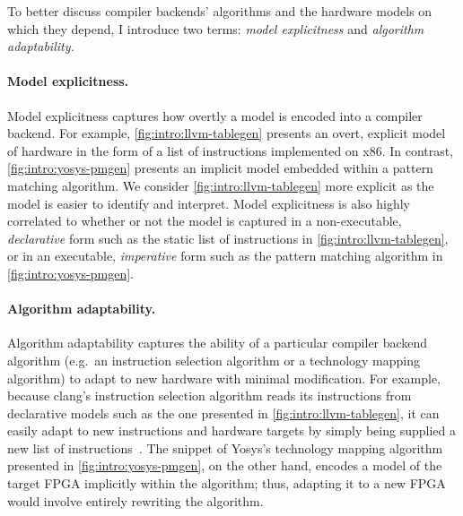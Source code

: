 To better discuss compiler backends'
  algorithms
  and the hardware models on which
  they depend,
  I introduce two terms:
  \textit{model explicitness}
  and
  \textit{algorithm adaptability.}
  
\paragraph{Model explicitness.}
Model explicitness
  captures
  how overtly
  a model is encoded
  into a compiler backend.
For example,
  \cref{fig:intro:llvm-tablegen}
  presents an overt, 
  explicit model of hardware
  in the form of a list
  of instructions
  implemented on x86.
In contrast,
  \cref{fig:intro:yosys-pmgen}
  presents an implicit model
  embedded within a pattern matching
  algorithm.
We consider
  \cref{fig:intro:llvm-tablegen} more explicit
  as the model is easier to identify
  and interpret.
Model explicitness is also highly correlated
  to whether or not the model
  is captured in a non-executable, \textit{declarative} form
  such as the static list of instructions
  in \cref{fig:intro:llvm-tablegen},
  or in an executable, \textit{imperative} form
  such as the pattern matching
  algorithm in \cref{fig:intro:yosys-pmgen}.

\paragraph{Algorithm adaptability.}
Algorithm adaptability captures the
  ability of a particular compiler backend
  algorithm
  (e.g.~an instruction selection
    algorithm
    or a technology mapping algorithm)
  to adapt
  to new hardware
  with minimal modification.
For example,
  because
  clang's instruction selection algorithm
  reads its instructions from
  declarative models
  such as the one presented in
  \cref{fig:intro:llvm-tablegen},
  it can easily adapt to new instructions
  and hardware targets
  by simply being supplied
  a new list of instructions~\cite{llvminstructionselection}.
The snippet of 
  Yosys's technology mapping algorithm
  presented in 
  \cref{fig:intro:yosys-pmgen},
  on the other hand,
  encodes a model of the 
  target FPGA
  implicitly within the algorithm;
  thus, adapting it to a new FPGA
  would involve entirely rewriting
  the algorithm.

\vspace{10mm}

